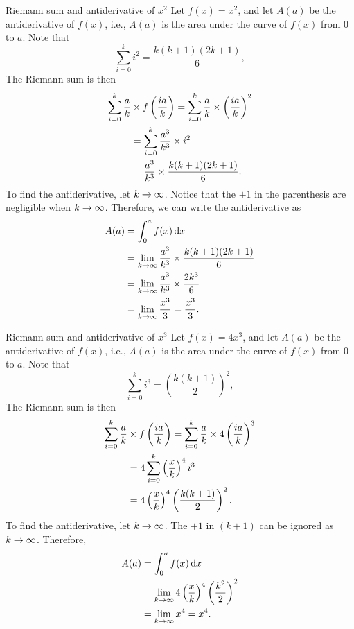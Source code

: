 \begin{exmp}{Riemann sum and antiderivative of $x^2$}{}
    Let $f(x) = x^2$, and let $A(a)$ be the antiderivative of $f(x)$, i.e., $A(a)$ is the area under the curve of $f(x)$ from $0$ to $a$. Note that
    \begin{equation}
        \sum_{i = 0}^{k}i^2 = \frac{k(k + 1)(2k + 1)}{6},
    \end{equation}
    The Riemann sum is then
    \begin{align}
        \sum_{i = 0}^{k}\frac{a}{k}&\times f\left( i a \over k \right) = \sum_{i = 0}^k\frac{a}{k}\times \left(ia\over k\right)^2 \\
        &= \sum_{i = 0}^k\frac{a^3}{k^3}\times i^2 \\
        &= \frac{a^3}{k^3}\times \frac{k(k + 1)(2k + 1)}{6}.
    \end{align}
    To find the antiderivative, let $k \rightarrow \infty$. Notice that the $+1$ in the parenthesis are negligible when $k \rightarrow \infty$. Therefore, we can write the antiderivative as
    \begin{align}
        A(a) &= \int_0^a f(x)\odif{x} \\
        &= \lim_{k \appr \infty}\frac{a^3}{k^3}\times \frac{k(k + 1)(2k + 1)}{6} \\
        &= \lim_{k \appr \infty}\frac{a^3}{k^3}\times \frac{2k^3}{6} \\
        &= \lim_{k \appr \infty}\frac{x^3}{3} = \frac{x^3}{3}.
    \end{align}
\end{exmp}

\begin{exmp}{Riemann sum and antiderivative of $x^3$}{}
    Let $f(x) = 4x^3$, and let $A(a)$ be the antiderivative of $f(x)$, i.e., $A(a)$ is the area under the curve of $f(x)$ from $0$ to $a$. Note that
    \begin{equation}
        \sum_{i = 0}^{k}i^3 = \left(\frac{k(k + 1)}{2}\right)^2,
    \end{equation}
    The Riemann sum is then
    \begin{align*}
        \sum_{i = 0}^{k}\frac{a}{k}&\times f\left( i a \over k \right) = \sum_{i = 0}^k\frac{a}{k}\times 4\left(ia\over k\right)^3 \\
        &= 4\sum_{i = 0}^k \left(\frac{x}{k}\right)^4 i^3 \\
        &= 4\left(\frac{x}{k}\right)^4\left(k(k+1)\over 2\right)^2.
    \end{align*}
    To find the antiderivative, let $k \rightarrow \infty$. The $+1$ in $(k + 1)$ can be ignored as $k \rightarrow \infty$. Therefore,
    \begin{align*}
        A(a) &= \int_0^a f(x)\odif{x} \\
        &= \lim_{k\appr\infty}4\left(x\over k\right)^4\left(k^2\over 2\right)^2 \\
        &= \lim_{k\appr\infty}x^4 = x^4.
    \end{align*}
\end{exmp}

